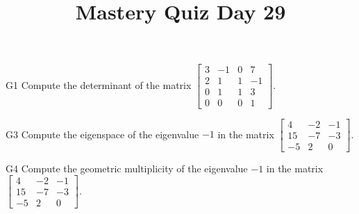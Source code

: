 \documentclass{sbgLAquiz}
\title{Mastery Quiz Day 29 }
\begin{document}
\begin{problem}{G1}
Compute the determinant of the matrix $\begin{bmatrix} 3 & -1 & 0  & 7 \\ 2 & 1 & 1 & -1  \\ 0 & 1 & 1 & 3 \\ 0 & 0 & 0 & 1   \end{bmatrix}$.
\end{problem}

\begin{problem}{G3}
Compute the eigenspace of the eigenvalue $-1$ in the matrix $\begin{bmatrix} 4 & -2 & -1 \\ 15 & -7 & -3 \\ -5 & 2 & 0 \end{bmatrix}$.
\end{problem}
\newpage

\begin{problem}{G4}
Compute the geometric multiplicity of the eigenvalue $-1$ in the matrix $\begin{bmatrix} 4 & -2 & -1 \\ 15 & -7 & -3 \\ -5 & 2 & 0 \end{bmatrix}$.  
\end{problem}
\end{document}
